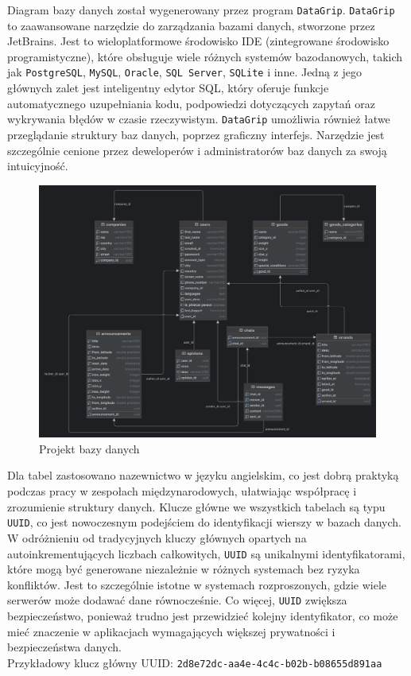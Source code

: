 Diagram bazy danych został wygenerowany przez program \texttt{DataGrip}. \texttt{DataGrip} to zaawansowane narzędzie do zarządzania bazami danych, stworzone przez JetBrains. Jest to wieloplatformowe środowisko IDE (zintegrowane środowisko programistyczne), które obsługuje wiele różnych systemów bazodanowych, takich jak \texttt{PostgreSQL}, \texttt{MySQL}, \texttt{Oracle}, \texttt{SQL Server}, \texttt{SQLite} i inne. Jedną z jego głównych zalet jest inteligentny edytor SQL, który oferuje funkcje automatycznego uzupełniania kodu, podpowiedzi dotyczących zapytań oraz wykrywania błędów w czasie rzeczywistym. \texttt{DataGrip} umożliwia również łatwe przeglądanie struktury baz danych, poprzez graficzny interfejs. Narzędzie jest szczególnie cenione przez deweloperów i administratorów baz danych za swoją intuicyjność.

\begin{figure}[H]
	\centering
		\includegraphics[width=1\linewidth]{rozdzial1/baza_danych.png}
	\caption{Projekt bazy danych}
	\label{Rys. fig:Projekt bazy danych}
\end{figure}

Dla tabel zastosowano nazewnictwo w języku angielskim, co jest dobrą praktyką podczas pracy w zespołach międzynarodowych, ułatwiając współpracę i zrozumienie struktury danych. Klucze główne we wszystkich tabelach są typu \texttt{UUID}, co jest nowoczesnym podejściem do identyfikacji wierszy w bazach danych. W odróżnieniu od tradycyjnych kluczy głównych opartych na autoinkrementujących liczbach całkowitych, \texttt{UUID} są unikalnymi identyfikatorami, które mogą być generowane niezależnie w różnych systemach bez ryzyka konfliktów. Jest to szczególnie istotne w systemach rozproszonych, gdzie wiele serwerów może dodawać dane równocześnie. Co więcej, \texttt{UUID} zwiększa bezpieczeństwo, ponieważ trudno jest przewidzieć kolejny identyfikator, co może mieć znaczenie w aplikacjach wymagających większej prywatności i bezpieczeństwa danych. \\
Przykładowy klucz główny UUID: \texttt{2d8e72dc-aa4e-4c4c-b02b-b08655d891aa} \\

